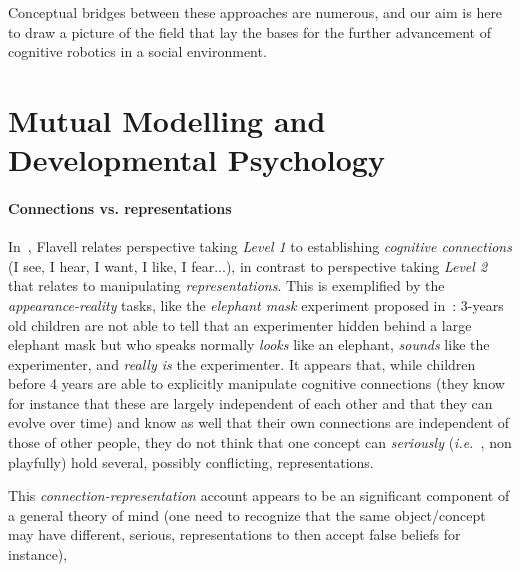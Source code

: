 \documentclass{sig-alternate}
\newcommand{\ie}{{\textit{i.e.~}}}
\begin{document}
Conceptual bridges between these approaches are numerous, and our aim is here to
draw a picture of the field that lay the bases for the further advancement of
cognitive robotics in a social environment.

\section{Mutual Modelling and Developmental Psychology}

\paragraph{Connections vs. representations}

In~\cite{flavell1990developmental}, Flavell relates perspective taking
\emph{Level 1} to establishing \emph{cognitive connections} (I see, I hear, I
want, I like, I fear...), in contrast to perspective taking \emph{Level 2} that
relates to manipulating \emph{representations}.  This is exemplified by the
\emph{appearance-reality} tasks, like the \emph{elephant mask} experiment
proposed in~\cite{flavell1990developmental}: 3-years old children are not able
to tell that an experimenter hidden behind a large elephant mask but who speaks
normally \emph{looks} like an elephant, \emph{sounds} like the experimenter, and
\emph{really is} the experimenter.  It appears that, while children before 4
years are able to explicitly manipulate cognitive connections (they know for
instance that these are largely independent of each other and that they can
evolve over time) and know as well that their own connections are independent of
those of other people, they do not think that one concept can \emph{seriously}
(\ie, non playfully) hold several, possibly conflicting, representations.

This \emph{connection-representation} account appears to be an significant
component of a general theory of mind (one need to recognize that the same
object/concept may have different, serious, representations to then accept false
beliefs for instance),

\end{document}
